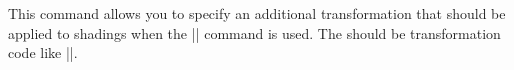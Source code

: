 \begin{command}{\pgfsetadditionalshadetransform{}}
    This command allows you to specify an additional transformation that should
    be applied to shadings when the |\pgfshadepath| command is used. The
     should be transformation code like
    ||.
\end{command}


